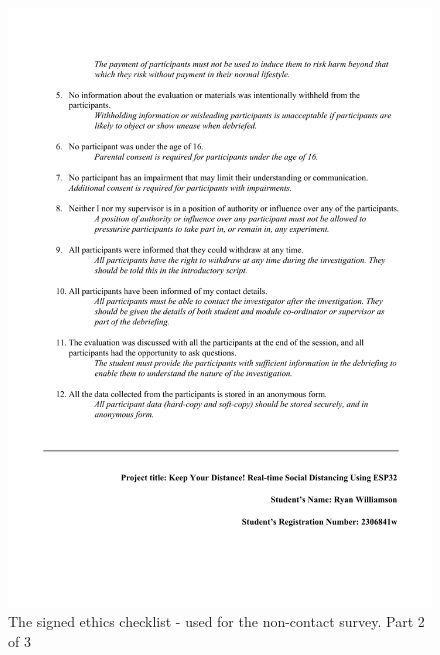 \documentclass{l4proj}
\begin{document}
\begin{appendices}
    \begin{figure}[!htb]
        \centering
        \includegraphics[width=1.0\linewidth]{images/ethics_checklist_signed 2.pdf}

        \caption{ The signed ethics checklist - used for the non-contact survey. Part 2 of 3 }

        \label{fig:ethics_checklist2}
    \end{figure}


\end{appendices}
\end{document}
